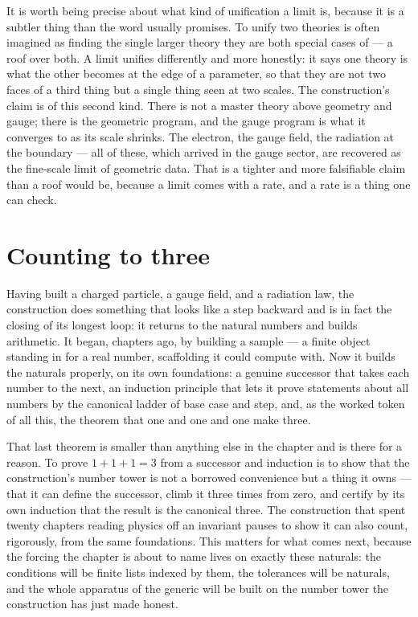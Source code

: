 It is worth being precise about what kind of unification a limit is, because it is a subtler thing than
the word usually promises. To unify two theories is often imagined as finding the single larger theory
they are both special cases of --- a roof over both. A limit unifies differently and more honestly: it
says one theory is what the other becomes at the edge of a parameter, so that they are not two faces of a
third thing but a single thing seen at two scales. The construction's claim is of this second kind. There
is not a master theory above geometry and gauge; there is the geometric program, and the gauge program is
what it converges to as its scale shrinks. The electron, the gauge field, the radiation at the boundary
--- all of these, which arrived in the gauge sector, are recovered as the fine-scale limit of geometric
data. That is a tighter and more falsifiable claim than a roof would be, because a limit comes with a
rate, and a rate is a thing one can check.

\section{Counting to three}
\label{se:counting-to-three}

Having built a charged particle, a gauge field, and a radiation law, the construction does something
that looks like a step backward and is in fact the closing of its longest loop: it returns to the
natural numbers and builds arithmetic. It began, chapters ago, by building a sample --- a finite object
standing in for a real number, scaffolding it could compute with. Now it builds the naturals properly,
on its own foundations: a genuine successor that takes each number to the next, an induction principle
that lets it prove statements about all numbers by the canonical ladder of base case and step, and, as
the worked token of all this, the theorem that one and one and one make three.

That last theorem is smaller than anything else in the chapter and is there for a reason. To prove
$1+1+1=3$ from a successor and induction is to show that the construction's number tower is not a
borrowed convenience but a thing it owns --- that it can define the successor, climb it three times from
zero, and certify by its own induction that the result is the canonical three. The construction that
spent twenty chapters reading physics off an invariant pauses to show it can also count, rigorously, from
the same foundations. This matters for what comes next, because the forcing the chapter is about to name
lives on exactly these naturals: the conditions will be finite lists indexed by them, the tolerances will
be naturals, and the whole apparatus of the generic will be built on the number tower the construction
has just made honest.

